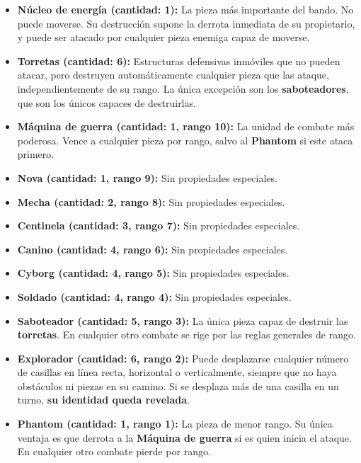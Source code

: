 \begin{itemize}
	\item \textbf{Núcleo de energía (cantidad: 1):} La pieza más importante del bando. No puede moverse. Su destrucción supone la derrota inmediata de su propietario, y puede ser atacado por cualquier pieza enemiga capaz de moverse.
	
	\item \textbf{Torretas (cantidad: 6):} Estructuras defensivas inmóviles que no pueden atacar, pero destruyen automáticamente cualquier pieza que las ataque, independientemente de su rango. La única excepción son los \textbf{saboteadores}, que son los únicos capaces de destruirlas.
	
	\item \textbf{Máquina de guerra (cantidad: 1, rango 10):} La unidad de combate más poderosa. Vence a cualquier pieza por rango, salvo al \textbf{Phantom} si este ataca primero.
	
	\item \textbf{Nova (cantidad: 1, rango 9):} Sin propiedades especiales.
	
	\item \textbf{Mecha (cantidad: 2, rango 8):} Sin propiedades especiales.
	
	\item \textbf{Centinela (cantidad: 3, rango 7):} Sin propiedades especiales.
	
	\item \textbf{Canino (cantidad: 4, rango 6):} Sin propiedades especiales.
	
	\item \textbf{Cyborg (cantidad: 4, rango 5):} Sin propiedades especiales.
	
	\item \textbf{Soldado (cantidad: 4, rango 4):} Sin propiedades especiales.
	
	\item \textbf{Saboteador (cantidad: 5, rango 3):} La única pieza capaz de destruir las \textbf{torretas}. En cualquier otro combate se rige por las reglas generales de rango.
	
	\item \textbf{Explorador (cantidad: 6, rango 2):} Puede desplazarse cualquier número de casillas en línea recta, horizontal o verticalmente, siempre que no haya obstáculos ni piezas en su camino. Si se desplaza más de una casilla en un turno, \textbf{su identidad queda revelada}.
	
	\item \textbf{Phantom (cantidad: 1, rango 1):} La pieza de menor rango. Su única ventaja es que derrota a la \textbf{Máquina de guerra} si es quien inicia el ataque. En cualquier otro combate pierde por rango.
	
\end{itemize}

